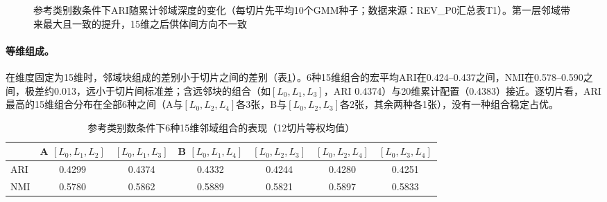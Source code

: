 \begin{figure}[htbp]
\centering
{}
\caption{参考类别数条件下ARI随累计邻域深度的变化（每切片先平均10个GMM种子；数据来源：REV\_P0汇总表T1）。第一层邻域带来最大且一致的提升，15维之后供体间方向不一致}
\label{fig:cc-depth-donor-p1}
\end{figure}

\paragraph{等维组成。}在维度固定为15维时，邻域块组成的差别小于切片之间的差别（表\ref{tab:cc-equaldim-p1}）。6种15维组合的宏平均ARI在0.424--0.437之间，NMI在0.578--0.590之间，极差约0.013，远小于切片间标准差；含远邻块的组合（如$[L_0,L_1,L_3]$，ARI 0.4374）与20维累计配置（0.4383）接近。逐切片看，ARI最高的15维组合分布在全部6种之间（A与$[L_0,L_2,L_4]$各3张，B与$[L_0,L_2,L_3]$各2张，其余两种各1张），没有一种组合稳定占优。

\begin{table}[htbp]
\centering
\caption{参考类别数条件下6种15维邻域组合的表现（12切片等权均值）}
\label{tab:cc-equaldim-p1}
\small
\begin{tabular}{lcccccc}
\toprule
 & A $[L_0,L_1,L_2]$ & $[L_0,L_1,L_3]$ & B $[L_0,L_1,L_4]$ & $[L_0,L_2,L_3]$ & $[L_0,L_2,L_4]$ & $[L_0,L_3,L_4]$\\
\midrule
ARI & 0.4299 & 0.4374 & 0.4332 & 0.4244 & 0.4280 & 0.4251\\
NMI & 0.5780 & 0.5862 & 0.5889 & 0.5821 & 0.5897 & 0.5833\\
\bottomrule
\end{tabular}
\end{table}

